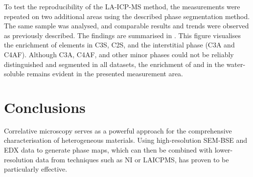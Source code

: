 To test the reproducibility of the LA-ICP-MS method, the measurements were repeated on two additional areas using the described phase segmentation method.
The same sample was analysed, and comparable results and trends were observed as previously described.
The findings are summarised in .
This figure visualises the enrichment of elements in \ac{C3S}, \ac{C2S}, and the interstitial phase (\ac{C3A} and \ac{C4AF}).
Although \ac{C3A}, \ac{C4AF}, and other minor phases could not be reliably distinguished and segmented in all datasets, the enrichment of  and  in the water-soluble  remains evident in the presented measurement area.

\section{Conclusions}

Correlative microscopy serves as a powerful approach for the comprehensive characterisation of heterogeneous materials.
Using high-resolution \ac{SEM}-\ac{BSE} and \ac{EDX} data to generate phase maps, which can then be combined with lower-resolution data from techniques such as \ac{NI} or \ac{LAICPMS}, has proven to be particularly effective.

